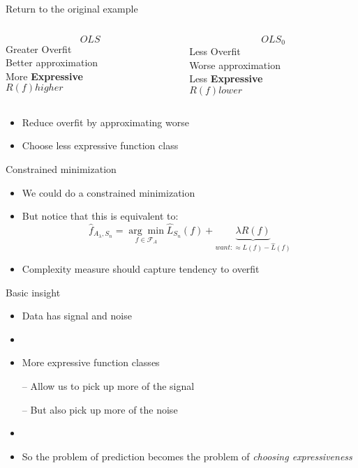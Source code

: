 \documentclass{beamer}
\begin{document}
\begin{frame}{Return to the original example}
	\begin{columns}
		\begin{column}[t]{0.5\textwidth}
			$$OLS$$
			\qquad Greater Overfit\\ \qquad Better approximation\\ \qquad More \textbf{Expressive}\\ \qquad $R(f) higher$
		\end{column}
		
		\begin{column}[t]{0.5\textwidth}
			$$OLS_0$$
			\qquad Less Overfit\\ \qquad Worse approximation\\ \qquad Less \textbf{Expressive}\\ \qquad $R(f) lower$
		\end{column}
	\end{columns}
	
	\begin{itemize}
		\vspace{1cm}
		\item Reduce overfit by approximating worse
		\item Choose less expressive function class
	\end{itemize}
\end{frame}

\begin{frame}{Constrained minimization}
	\begin{itemize}
		\item We could do a constrained minimization
		\item But notice that this is equivalent to:
		$$\hat{f}_{A_\lambda,S_n}=\underset{f \in \mathcal{F}_A}{\arg\min}\hat{L}_{S_n}(f)+\underbrace{\lambda R(f)}_{want:\approx L(f)-\hat{L}(f)}$$
		
		
		\item Complexity measure should capture tendency to overfit
	\end{itemize}
\end{frame}

\begin{frame}{Basic insight}
	\begin{itemize}
		\item Data has signal and noise
		\item[]
		\item More expressive function classes
		
		– Allow us to pick up more of the signal 
		
		– But also pick up more of the noise
		\item[]
		\item So the problem of prediction becomes the problem of \textit{choosing expressiveness}
	\end{itemize}
\end{frame}
\end{document}

